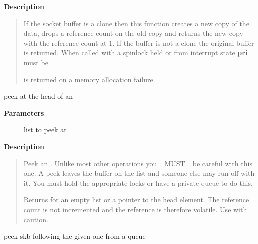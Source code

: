 \documentclass[a4paper,8pt,english]{sphinxmanual}
\begin{document}
\textbf{Description}
\begin{quote}

If the socket buffer is a clone then this function creates a new
copy of the data, drops a reference count on the old copy and returns
the new copy with the reference count at 1. If the buffer is not a clone
the original buffer is returned. When called with a spinlock held or
from interrupt state \textbf{pri} must be 

 is returned on a memory allocation failure.
\end{quote}

\begin{fulllineitems}
\label{networking/kapi:c.skb_peek}
peek at the head of an 

\end{fulllineitems}


\textbf{Parameters}
\begin{description}
\item[{}] \leavevmode
list to peek at

\end{description}

\textbf{Description}
\begin{quote}

Peek an {\hyperref[networking/kapi:c.sk_buff]{\emph{}}}. Unlike most other operations you \_MUST\_
be careful with this one. A peek leaves the buffer on the
list and someone else may run off with it. You must hold
the appropriate locks or have a private queue to do this.

Returns  for an empty list or a pointer to the head element.
The reference count is not incremented and the reference is therefore
volatile. Use with caution.
\end{quote}

\begin{fulllineitems}
\label{networking/kapi:c.skb_peek_next}
peek skb following the given one from a queue

\end{fulllineitems}
\end{document}
